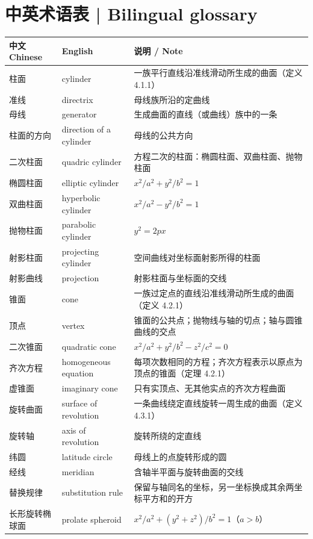 \documentclass[UTF8,11pt,a4paper]{ctexart}
\theoremstyle{definition}
\begin{document}
\section*{中英术语表 | Bilingual glossary}\label{sec:glossary}
\begin{small}
\begin{longtable}{@{}p{3.4cm}p{4.6cm}p{7.4cm}@{}}
\hline
中文 Chinese & English & 说明 / Note \\
\hline
\endhead
柱面 & cylinder & 一族平行直线沿准线滑动所生成的曲面（定义 4.1.1） \\
准线 & directrix & 母线族所沿的定曲线 \\
母线 & generator & 生成曲面的直线（或曲线）族中的一条 \\
柱面的方向 & direction of a cylinder & 母线的公共方向 \\
二次柱面 & quadric cylinder & 方程二次的柱面：椭圆柱面、双曲柱面、抛物柱面 \\
椭圆柱面 & elliptic cylinder & $x^2/a^2+y^2/b^2=1$ \\
双曲柱面 & hyperbolic cylinder & $x^2/a^2-y^2/b^2=1$ \\
抛物柱面 & parabolic cylinder & $y^2=2px$ \\
射影柱面 & projecting cylinder & 空间曲线对坐标面射影所得的柱面 \\
射影曲线 & projection & 射影柱面与坐标面的交线 \\
锥面 & cone & 一族过定点的直线沿准线滑动所生成的曲面（定义 4.2.1） \\
顶点 & vertex & 锥面的公共点；抛物线与轴的切点；轴与圆锥曲线的交点 \\
二次锥面 & quadratic cone & $x^2/a^2+y^2/b^2-z^2/c^2=0$ \\
齐次方程 & homogeneous equation & 每项次数相同的方程；齐次方程表示以原点为顶点的锥面（定理 4.2.1） \\
虚锥面 & imaginary cone & 只有实顶点、无其他实点的齐次方程曲面 \\
旋转曲面 & surface of revolution & 一条曲线绕定直线旋转一周生成的曲面（定义 4.3.1） \\
旋转轴 & axis of revolution & 旋转所绕的定直线 \\
纬圆 & latitude circle & 母线上的点旋转形成的圆 \\
经线 & meridian & 含轴半平面与旋转曲面的交线 \\
替换规律 & substitution rule & 保留与轴同名的坐标，另一坐标换成其余两坐标平方和的开方 \\
长形旋转椭球面 & prolate spheroid & $x^2/a^2+(y^2+z^2)/b^2=1$（$a>b$） \\

\end{longtable}
\end{small}
\end{document}
